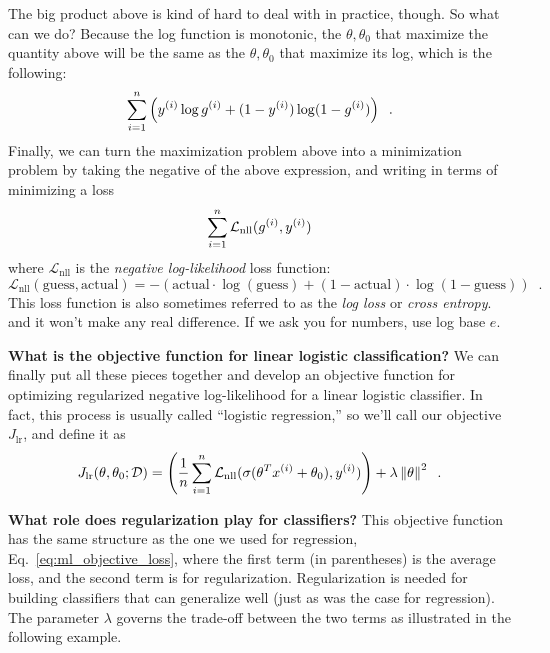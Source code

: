 The big product above is kind of hard to deal with in practice, though.
So what can we do?
Because the
log function is monotonic, the $\theta, \theta_0$ that maximize the
quantity above will be the same as the $\theta, \theta_0$ that
maximize its log, which is the following:
\begin{equation*}
  \sum_{i = 1}^n  \left( {y^{(i)}}\log {g^{(i)}} +
  (1 - y^{(i)})\log(1 - g^{(i)})\right)\;\;.
\end{equation*}
Finally, we can turn the maximization problem above into a minimization problem by taking the negative
of the above expression, and writing in terms of minimizing a loss
\begin{equation*}
  \sum_{i = 1}^n \mathcal{L}_\text{nll}(g^{(i)}, y^{(i)})
\end{equation*}
where $\mathcal{L}_\text{nll}$ is the {\em negative log-likelihood}
loss function:
\begin{equation*}
  \mathcal{L}_\text{nll}(\text{guess},\text{actual}) =
  -\left(\text{actual}\cdot \log (\text{guess}) + (1 - \text{actual})\cdot\log (1 -
  \text{guess})\right) \;\;.
\end{equation*}
This loss function is also sometimes referred to as the {\em log loss}
or {\em cross entropy}.%
  and it won't make any real difference.  If we ask you for numbers,
  use log base $e$.

{\bf What is the objective function for linear logistic classification?}
We can finally put all these pieces together and develop an objective
function for optimizing regularized negative log-likelihood for a
linear logistic classifier.  In
fact, this process is usually called ``logistic regression,'' so
we'll call our objective $J_\text{lr}$, and define it as
\begin{equation}
  J_\text{lr}(\theta, \theta_0; {\cal D}) =
  \left(\frac{1}{n} \sum_{i=1}^n
  \mathcal{L}_\text{nll}(\sigma(\theta^T x^{(i)} + \theta_0), y^{(i)})\right) +
  \lambda \left\lVert\theta\right\rVert^2\;\;.
  \label{eq:lr_with_reg}
\end{equation}


{\bf What role does regularization play for classifiers?}
This objective function has the same structure as the one we used for
regression, Eq.~\ref{eq:ml_objective_loss}, where the first term (in
parentheses) is the average loss, and the second term is for regularization.
Regularization is needed for building classifiers that can generalize
well (just as was the case for regression).  The parameter $\lambda$ governs
the trade-off between the two terms as illustrated in the following example.


